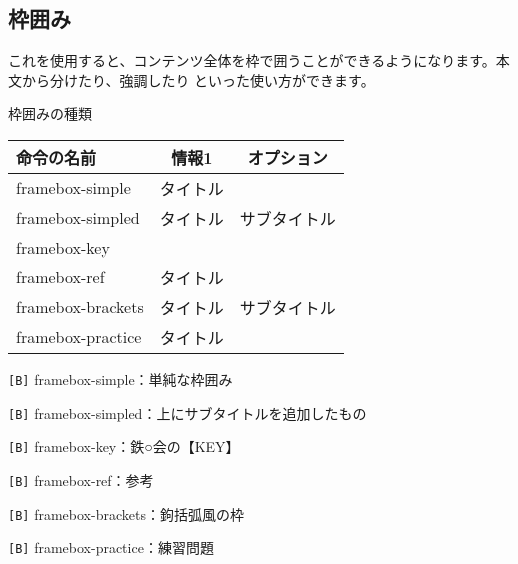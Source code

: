 \begin{multicols*}{2}
\section{枠囲み}
これを使用すると、コンテンツ全体を枠で囲うことができるようになります。本文から分けたり、強調したり
といった使い方ができます。
\begin{framebox-simple}{枠囲みの種類}
    \begin{table}[H]
        \begin{tabularx}{64mm}{|X|c|c|}
        \hline
        命令の名前             & 情報1  & オプション  \\ \hline
        framebox-simple   & タイトル &        \\ \hline
        framebox-simpled  & タイトル & サブタイトル \\ \hline
        framebox-key      &      &        \\ \hline
        framebox-ref      & タイトル &        \\ \hline
        framebox-brackets & タイトル & サブタイトル \\ \hline
        framebox-practice & タイトル &        \\ \hline
        \end{tabularx}
    \end{table}
    \begin{reitemize}
        \item \verb|[B]| framebox-simple：単純な枠囲み
        \item \verb|[B]| framebox-simpled：上にサブタイトルを追加したもの
        \item \verb|[B]| framebox-key：鉄○会の【KEY】
        \item \verb|[B]| framebox-ref：参考
        \item \verb|[B]| framebox-brackets：鉤括弧風の枠
        \item \verb|[B]| framebox-practice：練習問題
    \end{reitemize}
\end{framebox-simple}


\end{multicols*}
